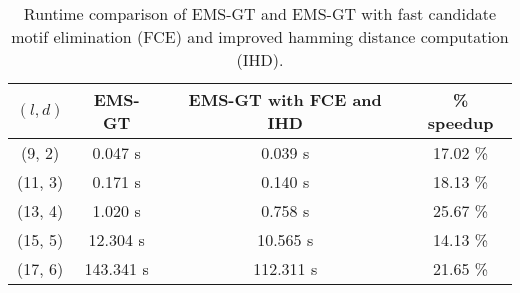 \begin{table}[h] %
	\renewcommand{\arraystretch}{1.3}
	\centering
	\begin{tabular}{|c|c|c|c|}
	\hline 
	\bfseries\boldmath $(l,d)$ & 
	\bfseries\boldmath EMS-GT & 
	\bfseries\boldmath EMS-GT with FCE and IHD & 
	\bfseries \% speedup\\
	\hline
	(9, 2) & 0.047 s &		0.039 s 	&	17.02 \%\\
	(11, 3) & 0.171 s &		0.140 s 	&	18.13 \%\\
	(13, 4) & 1.020 s &		0.758 s 	&	25.67 \%\\
	(15, 5) & 12.304 s &	10.565 s  	&	14.13 \%\\
	(17, 6) & 143.341 s &	112.311 s 	&	21.65 \%\\
	\hline\end{tabular}
	
	\caption{Runtime comparison of EMS-GT and EMS-GT with fast candidate motif elimination (FCE) and improved hamming distance computation (IHD).}
	\label{tbl:ems-gt-fce-hd-speedup}
\end{table}


